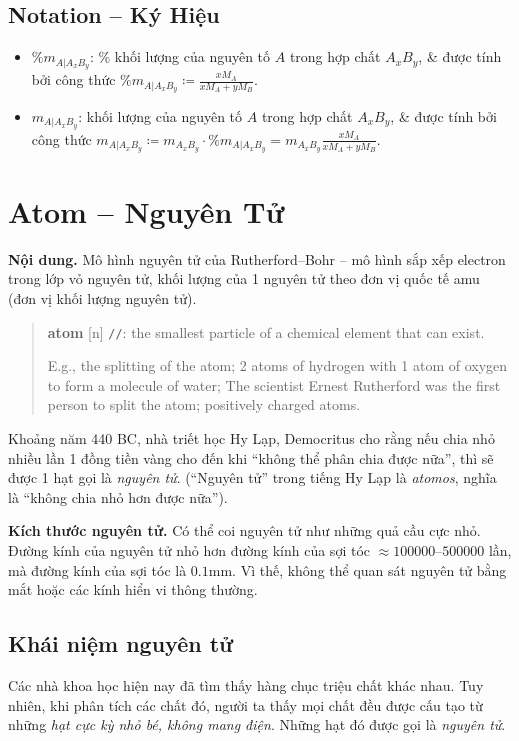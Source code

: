\documentclass{article}
\begin{document}
\subsection*{Notation -- Ký Hiệu}

\begin{itemize}
	\item $\%m_{A|A_xB_y}$: \% khối lượng của nguyên tố $A$ trong hợp chất $A_xB_y$, \& được tính bởi công thức $\%m_{A|A_xB_y}\coloneqq\frac{xM_A}{xM_A + yM_B}$.
	\item $m_{A|A_xB_y}$: khối lượng của nguyên tố $A$ trong hợp chất $A_xB_y$, \& được tính bởi công thức $m_{A|A_xB_y}\coloneqq m_{A_xB_y}\cdot\%m_{A|A_xB_y} = m_{A_xB_y}\frac{xM_A}{xM_A + yM_B}$.
\end{itemize}


\section{Atom -- Nguyên Tử}
\textsf{\textbf{Nội dung.} Mô hình nguyên tử của Rutherford--Bohr -- mô hình sắp xếp electron trong lớp vỏ nguyên tử, khối lượng của 1 nguyên tử theo đơn vị quốc tế amu (đơn vị khối lượng nguyên tử).}
\begin{quotation}
	\textbf{atom} [n] \texttt{/}\texttt{/}: the smallest particle of a chemical element that can exist.
	
	E.g., the splitting of the atom; 2 atoms of hydrogen with 1 atom of oxygen to form a molecule of water; The scientist Ernest Rutherford was the first person to split the atom; positively charged atoms.
\end{quotation}
Khoảng năm 440 BC, nhà triết học Hy Lạp, Democritus cho rằng nếu chia nhỏ nhiều lần 1 đồng tiền vàng cho đến khi ``không thể phân chia được nữa'', thì sẽ được 1 hạt gọi là \textit{nguyên tử}. (``Nguyên tử'' trong tiếng Hy Lạp là \textit{atomos}, nghĩa là ``không chia nhỏ hơn được nữa'').

\textbf{Kích thước nguyên tử.} Có thể coi nguyên tử như những quả cầu cực nhỏ. Đường kính của nguyên tử nhỏ hơn đường kính của sợi tóc $\approx100000$--$500000$ lần, mà đường kính của sợi tóc là $0.1$mm. Vì thế, không thể quan sát nguyên tử bằng mắt hoặc các kính hiển vi thông thường.

\subsection{Khái niệm nguyên tử}
Các nhà khoa học hiện nay đã tìm thấy hàng chục triệu chất khác nhau. Tuy nhiên, khi phân tích các chất đó, người ta thấy mọi chất đều được cấu tạo từ những \textit{hạt cực kỳ nhỏ bé, không mang điện}. Những hạt đó được gọi là \textit{nguyên tử}.
\end{document}
